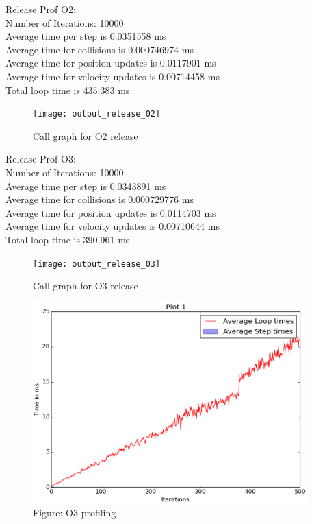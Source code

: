 \documentclass[english, 11pt]{article}
\begin{document}
Release Prof O2:\\
Number of Iterations: 10000\\
Average time per step is 0.0351558 ms\\
Average time for collisions is 0.000746974 ms\\
Average time for position updates is 0.0117901 ms\\
Average time for velocity updates is 0.00714458 ms\\
Total loop time is 435.383 ms\\
 \begin{figure}
	\begin{center}
		\texttt{[image: output\_release\_02]}
	\end{center}
	\caption{Call graph for O2 release}
\end{figure}

Release Prof O3: \\
Number of Iterations: 10000\\
Average time per step is 0.0343891 ms\\
Average time for collisions is 0.000729776 ms\\
Average time for position updates is 0.0114703 ms\\
Average time for velocity updates is 0.00710644 ms\\
Total loop time is 390.961 ms\\

\begin{figure}
	\begin{center}
		\texttt{[image: output\_release\_03]}
	\end{center}
	\caption{Call graph for O3 release}
\end{figure}


\begin{figure}
	\begin{center}
		\includegraphics[width=400px]{g02_lab09_plot01}
	\end{center}
	\caption{Figure: O3 profiling}
\end{figure}
\end{document}
